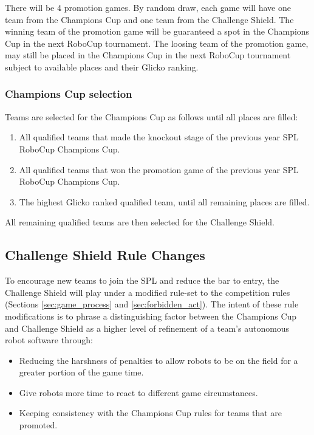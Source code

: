 There will be 4 promotion games. By random draw, each game will have one team from the Champions Cup and one team from the Challenge Shield. The winning team of the promotion game will be guaranteed a spot in the Champions Cup in the next RoboCup tournament. The loosing team of the promotion game, may still be placed in the Champions Cup in the next RoboCup tournament subject to available places and their Glicko ranking.


\subsubsection{Champions Cup selection}

Teams are selected for the Champions Cup as follows until all places are filled:
\begin{enumerate}
    \item All qualified teams that made the knockout stage of the previous year SPL RoboCup Champions Cup.
    \item All qualified teams that won the promotion game  of the previous year SPL RoboCup Champions Cup.
    \item The highest Glicko ranked qualified team, until all remaining places are filled.
\end{enumerate}

All remaining qualified teams are then selected for the Challenge Shield.


\subsection{Challenge Shield Rule Changes}
\label{sec:cs-rule-changes}

To encourage new teams to join the SPL and reduce the bar to entry, the Challenge Shield will play under a modified rule-set to the competition rules (Sections \ref{sec:game_process} and \ref{sec:forbidden_act}). The intent of these rule modifications is to phrase a distinguishing factor between the Champions Cup and Challenge Shield as a higher level of refinement of a team's autonomous robot software through:
\begin{itemize}
    \item Reducing the harshness of penalties to allow robots to be on the field for a greater portion of the game time.
    \item Give robots more time to react to different game circumstances.
    \item Keeping consistency with the Champions Cup rules for teams that are promoted.
\end{itemize}

